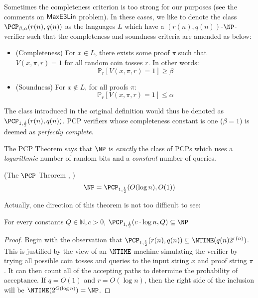 \begin{remark}
  Sometimes the completeness criterion is too strong for our purposes (see the comments on $\mathsf{MaxE3Lin}$ problem). In these cases, we like to denote the class $\PCP_{\beta, \alpha}(r(n),q(n))$ as the languages $L$ which have a $(r(n),q(n))$-$\NP$-verifier such that the completeness and soundness criteria are amended as below: \newline

  \begin{itemize}
    \item (Completeness) For $x \in L$, there exists some proof $\pi$ such that $V(x,\pi,r) = 1$ for all random coin tosses $r$. In other words:
    \begin{equation}
      \mathbb{P}_{r}[V(x,\pi,r) = 1] \geq \beta
    \end{equation}

    \item (Soundness) For $x \not\in L$, for all proofs $\pi$:
    \begin{equation}
      \mathbb{P}_{r}[V(x,\pi,r) = 1] \leq \alpha
    \end{equation}
  \end{itemize}
The class introduced in the original definition would thus be denoted as $\PCP_{1,\frac{1}{2}}(r(n),q(n))$. PCP verifiers whose completeness constant is one ($\beta = 1$) is deemed as \emph{perfectly complete}.
\end{remark}

The PCP Theorem says that $\NP$ is \emph{exactly} the class of PCPs which uses a \emph{logarithmic} number of random bits and a \emph{constant} number of queries.
%
\begin{theorem} \label{pcptheorem} (The $\PCP$ Theorem \cite{arora1998proof}, \cite{arora1998probabilistic})
%
\begin{equation}
\NP = \PCP_{1,\frac{1}{2}}(O(\log{n}), O(1))
\end{equation}
\end{theorem}

Actually, one direction of this theorem is not too difficult to see:

\begin{proposition}
For every constants $Q \in \mathbb{N}, c > 0$, $\PCP_{1,\frac{1}{2}}(c\cdot\log{n}, Q) \subseteq \NP$
\end{proposition}

\begin{proof}
Begin with the observation that $\PCP_{1,\frac{1}{2}}(r(n), q(n)) \subseteq \NTIME(q(n)2^{r(n)})$. This is justified by the view of an $\NTIME$ machine simulating the verifier by trying all possible coin tosses and queries to the input string $x$ and proof string $\pi$. It can then count all of the accepting paths to determine the probability of acceptance. If $q = O(1)$ and $r = O(\log{n})$, then the right side of the inclusion will be $\NTIME(2^{O(\log{n})}) = \NP$.
\end{proof}

